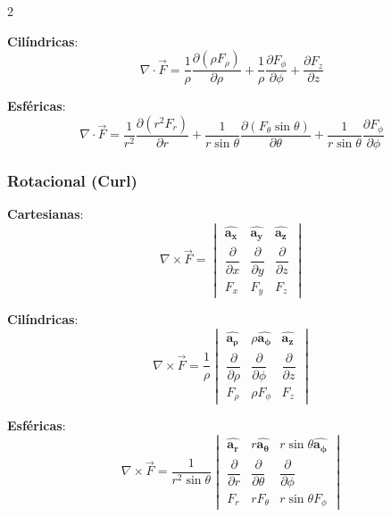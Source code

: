 \begin{multicols}{2}
\begin{itemform}
    \item \textbf{Cilíndricas}:
    $$\nabla \cdot \vec{F} = \frac{1}{\rho}\frac{\partial (\rho F_\rho)}{\partial \rho} + \frac{1}{\rho}\frac{\partial F_\phi}{\partial \phi} + \frac{\partial F_z}{\partial z}$$
    
    \item \textbf{Esféricas}:
    $$\nabla \cdot \vec{F} = \frac{1}{r^2}\frac{\partial (r^2 F_r)}{\partial r} + \frac{1}{r\sin\theta}\frac{\partial (F_\theta \sin\theta)}{\partial \theta} + \frac{1}{r\sin\theta}\frac{\partial F_\phi}{\partial \phi}$$
\end{itemform}

\subsubsection*{Rotacional (Curl)}
\begin{itemform}
    \item \textbf{Cartesianas}:
    $$\nabla \times \vec{F} = 
    \begin{vmatrix}
        \mathbf{\hat{a_x}} & \mathbf{\hat{a_y}} & \mathbf{\hat{a_z}} \\
        \dfrac{\partial}{\partial x} & \dfrac{\partial}{\partial y} & \dfrac{\partial}{\partial z} \\
        F_x & F_y & F_z
    \end{vmatrix}$$
    
    \item \textbf{Cilíndricas}:
    $$\nabla \times \vec{F} = \frac{1}{\rho}
    \begin{vmatrix}
        \mathbf{\hat{a_\rho}} & \rho\mathbf{\hat{a_\phi}} & \mathbf{\hat{a_z}} \\
        \dfrac{\partial}{\partial \rho} & \dfrac{\partial}{\partial \phi} & \dfrac{\partial}{\partial z} \\
        F_\rho & \rho F_\phi & F_z
    \end{vmatrix}$$
    
    \item \textbf{Esféricas}:
    $$\nabla \times \vec{F} = \frac{1}{r^2 \sin\theta}
    \begin{vmatrix}
        \mathbf{\hat{a_r}} & r\mathbf{\hat{a_\theta}} & r\sin\theta\mathbf{\hat{a_\phi}} \\
        \dfrac{\partial}{\partial r} & \dfrac{\partial}{\partial \theta} & \dfrac{\partial}{\partial \phi} \\
        F_r & r F_\theta & r\sin\theta F_\phi
    \end{vmatrix}$$
\end{itemform}

\end{multicols}
